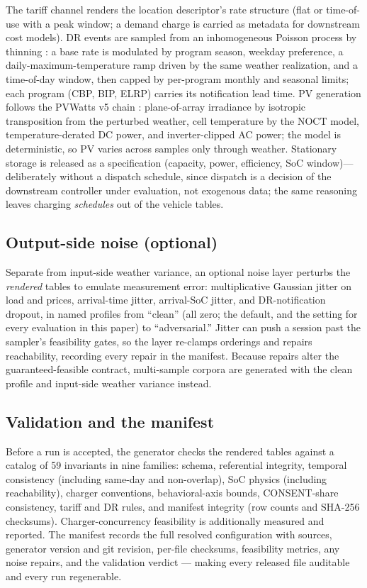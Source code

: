 The tariff channel renders the location descriptor's rate structure (flat or
time-of-use with a peak window; a demand charge is carried as metadata for
downstream cost models). DR events are sampled from an inhomogeneous Poisson
process by thinning \citep{lewis1979thinning}: a base rate is modulated by
program season, weekday preference, a daily-maximum-temperature ramp driven
by the same weather realization, and a time-of-day window, then capped by
per-program monthly and seasonal limits; each program (CBP, BIP, ELRP)
carries its notification lead time. PV generation follows the PVWatts v5
chain \citep{dobos2014pvwatts}: plane-of-array irradiance by isotropic
transposition from the perturbed weather, cell temperature by the NOCT model,
temperature-derated DC power, and inverter-clipped AC power; the model is
deterministic, so PV varies across samples only through weather. Stationary
storage is released as a specification (capacity, power, efficiency, SoC
window)---deliberately without a dispatch schedule, since dispatch is a
decision of the downstream controller under evaluation, not exogenous data;
the same reasoning leaves charging \emph{schedules} out of the vehicle
tables.

\subsection{Output-side noise (optional)}
\label{sec:noise}

Separate from input-side weather variance, an optional noise layer perturbs
the \emph{rendered} tables to emulate measurement error: multiplicative
Gaussian jitter on load and prices, arrival-time jitter, arrival-SoC jitter,
and DR-notification dropout, in named profiles from ``clean'' (all zero; the
default, and the setting for every evaluation in this paper) to
``adversarial.'' Jitter can push a session past the sampler's feasibility
gates, so the layer re-clamps orderings and repairs reachability, recording
every repair in the manifest. Because repairs alter the guaranteed-feasible
contract, multi-sample corpora are generated with the clean profile and
input-side weather variance instead.

\subsection{Validation and the manifest}
\label{sec:validation}

Before a run is accepted, the generator checks the rendered tables against a
catalog of 59 invariants in nine families: schema, referential integrity,
temporal consistency (including same-day and non-overlap), SoC physics
(including reachability), charger conventions, behavioral-axis bounds,
CONSENT-share consistency, tariff and DR rules, and manifest integrity
(row counts and SHA-256 checksums). Charger-concurrency feasibility is
additionally measured and reported. The manifest records the full resolved
configuration with sources, generator version and git revision, per-file
checksums, feasibility metrics, any noise repairs, and the validation verdict
--- making every released file auditable and every run regenerable.
